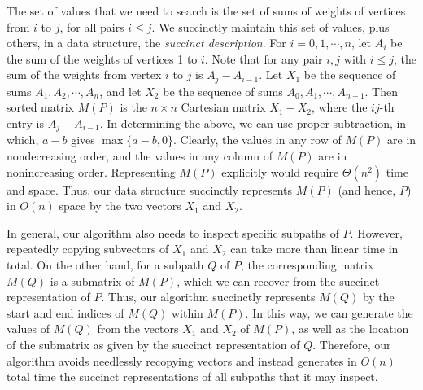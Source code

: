 The set of values that we need to search is the set of sums of weights of vertices from $i$ to $j$, for all pairs $i\leq j$. 
We succinctly maintain this set of values, plus others, in a data structure, the \emph{succinct description}. 
For $i=0,1, \cdots ,n$, let $A_i$ be the sum of the weights of vertices 1 to $i$.
Note that for any pair $i,j$ with $i \leq j$, the sum of the weights from vertex $i$ to $j$ is $A_j - A_{i-1}$.
Let $X_1$ be the sequence of sums $A_1, A_2, \cdots ,A_n$, and let $X_2$ be the sequence of sums $A_0, A_1, \cdots ,A_{n-1}$.
Then sorted matrix $M(P)$ is the $n \times n$ Cartesian matrix $X_1-X_2$, where the $ij$-th entry is $A_j-A_{i-1}$.
In determining the above, we can use proper subtraction, in which, $a-b$ gives $\max \{a-b,0\}$.
Clearly, the values in any row of $M(P)$ are in nondecreasing order, and the values in any column of $M(P)$ are in nonincreasing order. 
Representing $M(P)$ explicitly would require $\Theta(n^2)$ time and space. 
Thus, our data structure succinctly represents $M(P)$ (and hence, $P$) in $O(n)$ space by the two vectors $X_1$ and $X_2$. 

In general, our algorithm also needs to inspect specific subpaths of $P$. 
However, repeatedly copying subvectors of $X_1$ and $X_2$ can take more than linear time in total. 
On the other hand, for a subpath $Q$ of $P$, the corresponding matrix $M(Q)$ is a submatrix of $M(P)$, which we can recover from the succinct representation of $P$. 
Thus, our algorithm succinctly represents $M(Q)$ by the start and end indices of $M(Q)$ within $M(P)$. 
In this way, we can generate the values of $M(Q)$ from the vectors $X_1$ and $X_2$ of $M(P)$, as well as the location of the submatrix as given by the succinct representation of $Q$. 
Therefore, our algorithm avoids needlessly recopying vectors and instead generates in $O(n)$ total time the succinct representations of all subpaths that it may inspect.

